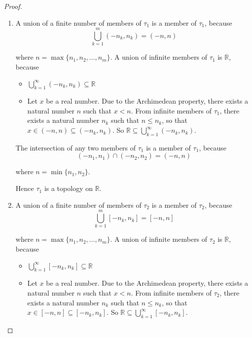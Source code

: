 \begin{proof}
    \begin{enumerate}[label={(\roman*)}]
        \item A union of a finite number of members of $\tau_{1}$ is a member of $\tau_{1}$, because
              \[
                  \bigcup^{m}_{k=1} (-n_{k}, n_{k}) = (-n, n)
              \]

              where $n = \max\{ n_{1}, n_{2}, \ldots, n_{m} \}$. A union of infinite members of $\tau_{1}$ is $\mathbb{R}$, because
              \begin{itemize}
                  \item $\bigcup^{\infty}_{k=1} (-n_{k}, n_{k})\subseteq \mathbb{R}$
                  \item Let $x$ be a real number. Due to the Archimedean property, there exists a natural number $n$ such that $x < n$. From infinite members of $\tau_{1}$, there exists a natural number $n_{k}$ such that $n\leq n_{k}$, so that $x\in (-n, n)\subseteq (-n_{k}, n_{k})$. So $\mathbb{R}\subseteq \bigcup^{\infty}_{k=1} (-n_{k}, n_{k})$.
              \end{itemize}

              The intersection of any two members of $\tau_{1}$ is a member of $\tau_{1}$, because
              \[
                  (-n_{1}, n_{1})\cap (-n_{2}, n_{2}) = (-n, n)
              \]

              where $n = \min\{ n_{1}, n_{2} \}$.

              Hence $\tau_{1}$ is a topology on $\mathbb{R}$.
        \item A union of a finite number of members of $\tau_{2}$ is a member of $\tau_{2}$, because
              \[
                  \bigcup^{m}_{k=1} [-n_{k}, n_{k}] = [-n, n]
              \]

              where $n = \max\{ n_{1}, n_{2}, \ldots, n_{m} \}$. A union of infinite members of $\tau_{2}$ is $\mathbb{R}$, because
              \begin{itemize}
                  \item $\bigcup^{\infty}_{k=1} [-n_{k}, n_{k}]\subseteq \mathbb{R}$
                  \item Let $x$ be a real number. Due to the Archimedean property, there exists a natural number $n$ such that $x < n$. From infinite members of $\tau_{2}$, there exists a natural number $n_{k}$ such that $n\leq n_{k}$, so that $x\in [-n, n]\subseteq [-n_{k}, n_{k}]$. So $\mathbb{R}\subseteq \bigcup^{\infty}_{k=1} [-n_{k}, n_{k}]$.
              \end{itemize}


\end{enumerate}
\end{proof}
